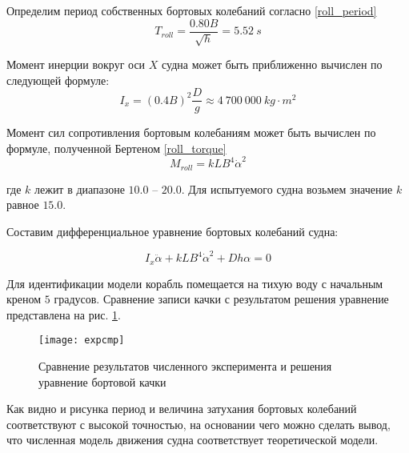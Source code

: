 Определим период собственных бортовых колебаний согласно \citep{hanovich47} \eqref{roll_period}
\begin{equation}
	T_{roll} = \frac{0.80B}{\sqrt{h}} = 5.52\ s
	\label{roll_period}
\end{equation}

Момент инерции вокруг оси $X$ судна может быть приближенно вычислен по следующей формуле:
\begin{equation}
	I_{x} = (0.4B)^2 \frac{D}{g} \approx 4\ 700\ 000\ kg\cdot m^2
	\label{roll_torque}
\end{equation}



Момент сил сопротивления бортовым колебаниям может быть вычислен по формуле, полученной Бертеном \eqref{roll_torque}
\begin{equation}
	M_{roll} = kLB^4\dot{\alpha}^2
	\label{roll_torque}
\end{equation}

где $k$ лежит в диапазоне $10.0$ -- $20.0$. Для испытуемого судна возьмем значение $k$ равное $15.0$.

Составим дифференциальное уравнение бортовых колебаний судна:

\begin{equation}
	I_x \ddot{\alpha} + kLB^4\dot{\alpha}^2 + Dh \alpha = 0
	\label{roll_eq}
\end{equation}

Для идентификации модели корабль помещается на тихую воду с начальным креном $5$ градусов. Сравнение записи качки с результатом решения уравнение представлена на рис. \ref{expcmp}.

\begin{figure}[ht]
\begin{center}
\texttt{[image: expcmp]}
\end{center}
\caption{Сравнение результатов численного эксперимента и решения уравнение бортовой качки}
\label{expcmp}
\end{figure}

Как видно и рисунка период и величина затухания бортовых колебаний соответствуют с высокой точностью, на основании чего можно сделать вывод, что численная модель движения судна соответствует теоретической модели.


